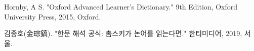 \par Hornby, A S. "Oxford Advanced Learner's Dictionary." 9th Edition, Oxford University Press, 2015, Oxford.
\par 김종호(金琮鎬). "한문 해석 공식: 촘스키가 논어를 읽는다면." 한티미디어, 2019, 서울.
